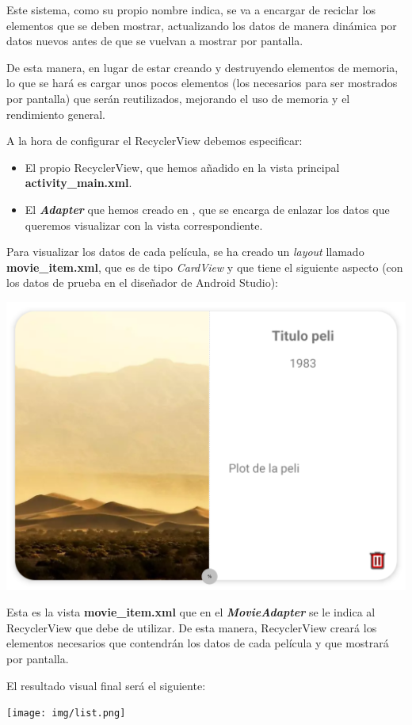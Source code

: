 \documentclass{\ClassPath/viu-tfm-template}
\begin{document}
Este sistema, como su propio nombre indica, se va a encargar de reciclar los elementos que se deben mostrar, actualizando los datos de manera dinámica por datos nuevos antes de que se vuelvan a mostrar por pantalla.

De esta manera, en lugar de estar creando y destruyendo elementos de memoria, lo que se hará es cargar unos pocos elementos (los necesarios para ser mostrados por pantalla) que serán reutilizados, mejorando el uso de memoria y el rendimiento general.

A la hora de configurar el RecyclerView debemos especificar:
\begin{itemize}
    \item El propio RecyclerView, que hemos añadido en la vista principal \textbf{activity\_main.xml}.

    \item El \textit{\textbf{Adapter}} que hemos creado en , que se encarga de enlazar los datos que queremos visualizar con la vista correspondiente.
\end{itemize}

Para visualizar los datos de cada película, se ha creado un \textit{layout} llamado \textbf{movie\_item.xml}, que es de tipo \textit{CardView} y que tiene el siguiente aspecto (con los datos de prueba en el diseñador de Android Studio):

\begin{center}
    \vspace{-15pt}
    \includegraphics[width=0.4\linewidth]{img/movie_item.png}
    \vspace{-20pt}
\end{center}

Esta es la vista \textbf{movie\_item.xml} que en el \textbf{\textit{MovieAdapter}} se le indica al RecyclerView que debe de utilizar. De esta manera, RecyclerView creará los elementos necesarios que contendrán los datos de cada película y que mostrará por pantalla.


El resultado visual final será el siguiente:

\begin{center}
    \texttt{[image: img/list.png]}
\end{center}
\end{document}
